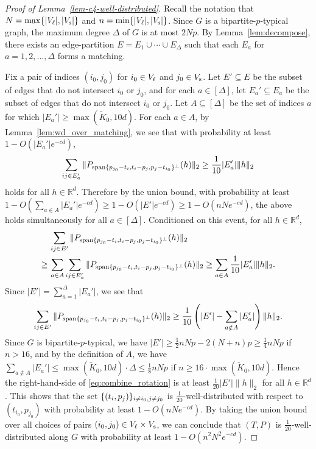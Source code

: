 \begin{proof}[Proof of Lemma~\ref{lem-c4-well-distributed}]
Recall the notation that $N = \max\{|V_\ell|, |V_\text{s}|\}$ and $n = \min\{|V_\ell|, |V_\text{s}|\}$.  Since $G$ is a bipartite-$p$-typical graph, the maximum degree $\Delta$ of $G$ is at most
$2N p$. By Lemma~\ref{lem:decompose}, there exists an edge-partition 
$E = E_1 \cup \cdots \cup E_\Delta$ such that each $E_a$ for $a=1,2,\ldots, \Delta$ forms
a matching.

Fix a pair of indices $(i_0,j_0)$ for $i_0 \in V_\ell$ and $j_0 \in V_\text{s}$.
Let $E' \subseteq E$ be the subset of edges that do not intersect $i_{0}$ or $j_{0}$, and
for each $a \in [\Delta]$, let $E_a' \subseteq E_a$ be the subset of edges that
do not intersect $i_{0}$ or $j_{0}$.
Let $A \subseteq [\Delta]$ be the set of indices $a$ for which $|E_a'| \ge \max(\tilde{K}_0, 10 d)$.
For each $a \in A$, by Lemma~\ref{lem:wd_over_matching}, we see that 
with probability at least $1 - O(|E_a'| e^{-cd})$,
\[
	\sum_{ij \in E_a'} \| P_{\operatorname{span}\{p_{j_0}-t_{i},t_{i}-p_{j}, p_j-t_{i_0}\}^{\perp}} (h) \|_2
	\ge \frac{1}{10} |E_a'| \| h \|_2
\]
holds for all $h \in \mathbb{R}^d$.
Therefore by the union bound, with probability at least $1 - O(\sum_{a \in A} |E_a'| e^{-cd}) \geq 1 - O( |E'| e^{-cd}) \geq 1 - O( nN e^{-cd})$, the
above holds simultaneously for all $a \in [\Delta]$. Conditioned on this event, for all $h \in \mathbb{R}^d$,
\begin{align*}
	&\, \sum_{ij \in E'} \| P_{\operatorname{span}\{p_{j_0}-t_{i},t_{i}-p_{j}, p_j-t_{i_0}\}^{\perp}} (h) \|_2 \\
	\ge &\,
	\sum_{a \in A} \sum_{ij \in E_a'} \| P_{\operatorname{span}\{p_{j_0}-t_{i},t_{i}-p_{j}, p_j-t_{i_0}\}^{\perp}} (h) \|_2
	\ge \sum_{a \in A} \frac{1}{10} |E_a'| \| h \|_2.
\end{align*}
Since $|E'| = \sum_{a =1}^{\Delta} |E_a'|$, we see that
\begin{align} \label{eq:combine_rotation}
	\sum_{ij \in E'} \| P_{\operatorname{span}\{p_{j_0}-t_{i},t_{i}-p_{j}, p_j-t_{i_0}\}^{\perp}} (h) \|_2
	\ge \frac{1}{10} \left( |E'| - \sum_{a \notin A} |E_a'| \right) \| h \|_2.
\end{align}
Since $G$ is bipartite-$p$-typical, we have $|E'| \ge \frac{1}{2}nNp - 2(N+n)p \ge \frac{1}{4}nNp$ if $n > 16$, and by the  definition of $A$, we have
$\sum_{a \notin A} |E_a'| \le  \max(\tilde{K}_0, 10 d) \cdot \Delta \le \frac{1}{8}nNp$ if $n \geq 16 \cdot \max(\tilde{K}_0, 10 d)$.
Hence the right-hand-side of \eqref{eq:combine_rotation} is at least
$\frac{1}{20}|E'| \| h \|_2$ for all $h \in \mathbb{R}^d$. This shows that the set $\{(t_{i},p_j)\}_{i \neq i_0, j \neq j_0}$
is $\frac{1}{20}$-well-distributed with respect to $(t_{i_0}, p_{j_0})$ with probability 
at least $1 - O(n N e^{-cd})$. By taking the union bound over all 
choices of pairs $(i_0, j_0) \in V_\ell \times V_\text{s}$, we can conclude that $(T,P)$ is
$\frac{1}{20}$-well-distributed along $G$ with probability at least 
$1 - O(n^2 N^2 e^{-cd})$.
\end{proof}

